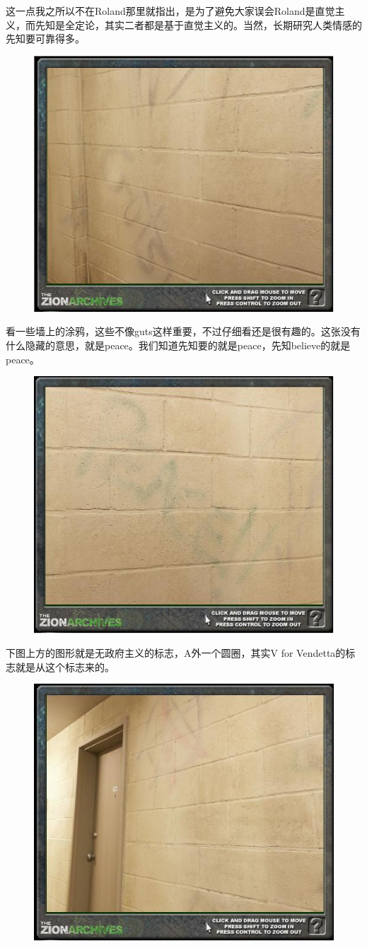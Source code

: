 \documentclass[UTF8]{ctexart}
\begin{document}
这一点我之所以不在Roland那里就指出，是为了避免大家误会Roland是直觉主义，而先知是全定论，其实二者都是基于直觉主义的。当然，长期研究人类情感的先知要可靠得多。

\begin{figure}[htb]
\centering
\includegraphics[width=0.5\linewidth]{fig/43ead53fab4bbcc27c1e7125.jpg}
\end{figure}

看一些墙上的涂鸦，这些不像guts这样重要，不过仔细看还是很有趣的。这张没有什么隐藏的意思，就是peace。我们知道先知要的就是peace，先知believe的就是peace。

\begin{figure}[htb]
\centering
\includegraphics[width=0.5\linewidth]{fig/27d5d1a2c52f2dadcaefd05a.jpg}
\end{figure}

下图上方的图形就是无政府主义的标志，A外一个圆圈，其实V for Vendetta的标志就是从这个标志来的。

\begin{figure}[htb]
\centering
\includegraphics[width=0.5\linewidth]{fig/45c00df4fb76d7ef7709d75a.jpg}
\end{figure}
\end{document}

